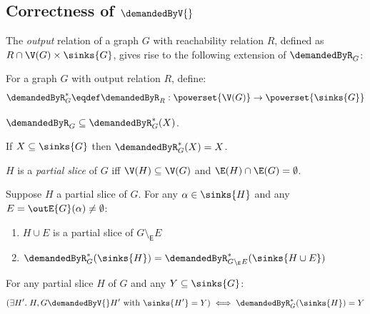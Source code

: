 \subsection{Correctness of $\demandedByV{}$}

The \emph{output} relation of a graph $G$ with reachability relation $R$, defined as $R \cap \V(G) \times
\sinks{G}$, gives rise to the following extension of $\demandedByR_{G}$:

\begin{definition}
   For a graph $G$ with output relation $R$, define:
   \[\demandedByR^*_G \eqdef \demandedByR_{R}: \powerset{\V(G)} \to \powerset{\sinks{G}}\]
\end{definition}

\begin{lemma}
   $\demandedByR_{G} \subseteq \demandedByR^*_{G}(X)$.
\end{lemma}

\begin{lemma}
   \label{lem:appendix:proof:conjugate:algorithms:sinks-fixpoint}
   If $X \subseteq \sinks{G}$ then $\demandedByR^*_{G}(X) = X$.
\end{lemma}

\begin{definition}
$H$ is a \emph{partial slice} of $G$ iff $\V(H) \subseteq \V(G)$ and $\E(H) \cap \E(G) = \emptyset$.
\end{definition}

\begin{lemma}
   \label{lem:appendix:proof:conjugate:algorithms:edge-conservation}
   Suppose $H$ a partial slice of $G$. For any $\alpha \in \sinks{H}$ and any
   $E = \outE{G}(\alpha) \neq \emptyset$:
   \begin{enumerate}
      \item $H \cup E$ is a partial slice of $G \setminus_{\mathsf{E}} E$
      \item $\demandedByR^*_G(\sinks{H}) = \demandedByR^*_{G \setminus_{\mathsf{E}} E} (\sinks{H \cup E})$
   \end{enumerate}
\end{lemma}

\begin{proposition}
   \label{prop:appendix:proof:conjugate:algorithms:correctness-demByV}
   For any partial slice $H$ of $G$ and any $Y \subseteq \sinks{G}$:
   \[(\exists H'.\;H, G \demandedByV{} H'\text{ with }\sinks{H'} = Y) \iff \demandedByR^*_G(\sinks{H}) = Y\]
\end{proposition}

